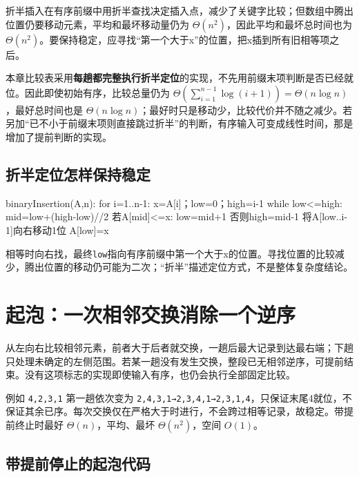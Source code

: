 折半插入在有序前缀中用折半查找决定插入点，减少了关键字比较；但数组中腾出位置仍要移动元素，平均和最坏移动量仍为 \(\Theta(n^2)\)，因此平均和最坏总时间也为 \(\Theta(n^2)\)。要保持稳定，应寻找``第一个大于x''的位置，把x插到所有旧相等项之后。

本章比较表采用\textbf{每趟都完整执行折半定位}的实现，不先用前缀末项判断是否已经就位。因此即使初始有序，比较总量仍为 \(\Theta(\sum_{i=1}^{n-1}\log(i+1))=\Theta(n\log n)\)，最好总时间也是 \(\Theta(n\log n)\)；最好时只是移动少，比较代价并不随之减少。若另加``已不小于前缀末项则直接跳过折半''的判断，有序输入可变成线性时间，那是增加了提前判断的实现。

\subsection{折半定位怎样保持稳定}\label{DS08-bin-insert}

\begin{codeblock}[language={}]
binaryInsertion(A,n):
    for i=1..n-1:
        x=A[i]；low=0；high=i-1
        while low<=high:
            mid=low+(high-low)//2
            若A[mid]<=x: low=mid+1
            否则high=mid-1
        将A[low..i-1]向右移动1位
        A[low]=x
\end{codeblock}

相等时向右找，最终\texttt{low}指向有序前缀中第一个大于x的位置。寻找位置的比较减少，腾出位置的移动仍可能为二次；``折半''描述定位方式，不是整体复杂度结论。

\section{起泡：一次相邻交换消除一个逆序}\label{DS08-03}

从左向右比较相邻元素，前者大于后者就交换，一趟后最大记录到达最右端；下趟只处理未确定的左侧范围。若某一趟没有发生交换，整段已无相邻逆序，可提前结束。没有这项标志的实现即使输入有序，也仍会执行全部固定比较。

例如 \texttt{4,\allowbreak{}2,\allowbreak{}3,\allowbreak{}1} 第一趟依次变为 \texttt{2,\allowbreak{}4,\allowbreak{}3,\allowbreak{}1→2,\allowbreak{}3,\allowbreak{}4,\allowbreak{}1→2,\allowbreak{}3,\allowbreak{}1,\allowbreak{}4}，只保证末尾4就位，不保证其余已序。每次交换仅在严格大于时进行，不会跨过相等记录，故稳定。带提前终止时最好 \(\Theta(n)\)，平均、最坏 \(\Theta(n^2)\)，空间 \(O(1)\)。

\subsection{带提前停止的起泡代码}\label{DS08-bubble-code}

